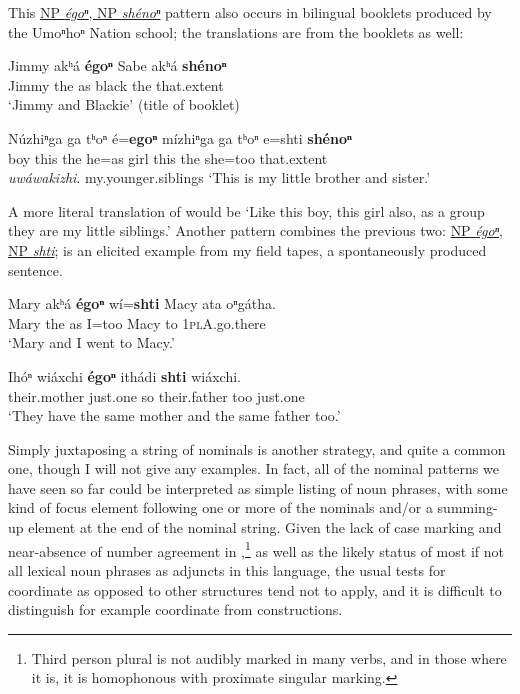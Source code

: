 \documentclass[output=paper]{LSP/langsci}
\begin{document}
This \underline{NP \textit{égoⁿ}, NP \textit{shénoⁿ}} pattern also occurs in bilingual booklets produced by the Umoⁿhoⁿ Nation school; the translations are from the booklets as well:
	
\begin{exe}	
\ex\label{ex:rudin:25}
\gll Jimmy 	akʰá \textbf{égoⁿ} Sabe akʰá \textbf{shénoⁿ} \\
Jimmy the  	as 	black 	the  	that.extent \\
\trans `Jimmy and Blackie' (title of booklet)

\ex\label{ex:rudin:26} 
\gll Núzhiⁿga ga tʰoⁿ é=\textbf{egoⁿ} mízhiⁿga ga  tʰoⁿ e=shti 	\textbf{shénoⁿ}  \\
boy 	this 	the 	he=as   	girl   this the she=too  that.extent 	 \\

\textit{uwáwakizhi}.
my.younger.siblings
\trans `This is my little brother and sister.' 	
\end{exe}	 
	
A more literal translation of  would be `Like this boy, this girl also, as a group they are my little siblings.' Another pattern combines the previous two:   \underline{NP \textit{égoⁿ}, NP \textit{shti}};  is an elicited example from my field tapes,  a spontaneously produced sentence. 

\begin{exe}	
\ex\label{ex:rudin:27}
\gll Mary akʰá \textbf{égoⁿ}  wí=\textbf{shti} Macy 	ata 	oⁿgátha. \\
Mary the as I=too Macy to 	\textsc{1plA}.go.there \\
\trans`Mary and  I went to Macy.'

\ex\label{ex:rudin:28}
\gll Ihóⁿ  wiáxchi  \textbf{égoⁿ} ithádi  \textbf{shti} wiáxchi. \\
their.mother  just.one so their.father too just.one \\
\trans `They have the same mother and the same father too.'
\end{exe}	

Simply juxtaposing a string of nominals is another  strategy, and quite a common one, though I will not give any examples. In fact, all of the nominal  patterns we have seen so far could be interpreted as simple listing of noun phrases, with some kind of focus element following one or more of the nominals and/or a summing-up element at the end of the nominal string. Given the lack of case marking and near-absence of number agreement  in ,\footnote{Third person plural is not audibly marked in many verbs, and in those where it is, it is homophonous with
proximate singular marking.} as well as the likely status of most if not all lexical noun phrases as adjuncts in this language, the usual tests for coordinate as opposed to other structures tend not to apply, and it is difficult to distinguish for example coordinate from  constructions.
\end{document}
